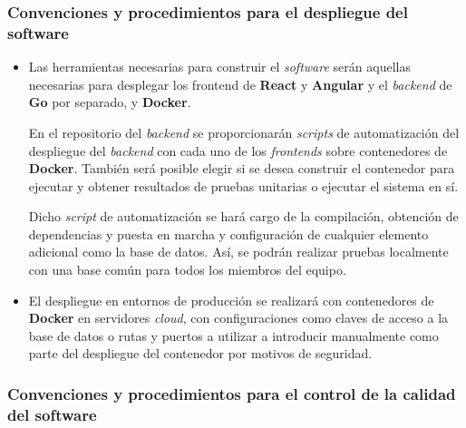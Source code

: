 \documentclass[11pt, a4paper, titlepage]{article}
\begin{document}
\subsubsection{Convenciones y procedimientos para el despliegue del software}

\begin{itemize}
    \item Las herramientas necesarias para construir el \textit{software} serán aquellas necesarias para desplegar los frontend de \textbf{React} y \textbf{Angular} y el \textit{backend} de \textbf{Go} por separado, y \textbf{Docker}. \newline
    
    En el repositorio del \textit{backend} se proporcionarán \textit{scripts} de automatización del despliegue del \textit{backend} con cada uno de los \textit{frontends} sobre contenedores de \textbf{Docker}. También será posible elegir si se desea construir el contenedor para ejecutar y obtener resultados de pruebas unitarias o ejecutar el sistema en sí. \newline
    
    Dicho \textit{script} de automatización se hará cargo de la compilación, obtención de dependencias y puesta en marcha y configuración de cualquier elemento adicional como la base de datos. Así, se podrán realizar pruebas localmente con una base común para todos los miembros del equipo.
    \item El despliegue en entornos de producción se realizará con contenedores de \textbf{Docker} en servidores \textit{cloud}, con configuraciones como claves de acceso a la base de datos o rutas y puertos a utilizar a introducir manualmente como parte del despliegue del contenedor por motivos de seguridad.
\end{itemize}

\subsubsection{Convenciones y procedimientos para el control de la calidad del software}
\end{document}
